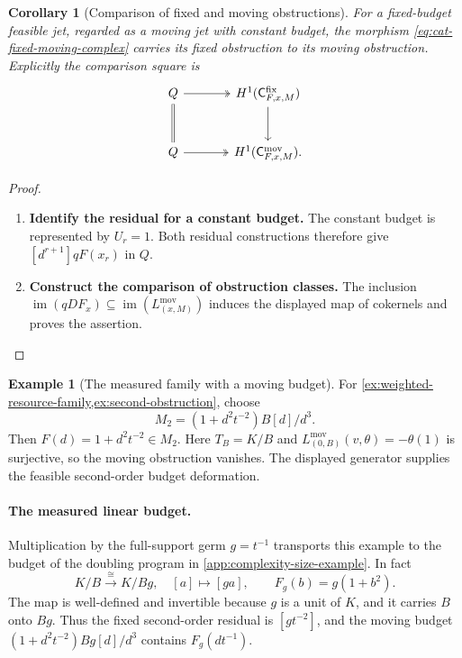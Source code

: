 \documentclass[11pt,a4paper]{article}
\numberwithin{algorithm}{section}
\numberwithin{equation}{section}
\newtheorem{corollary}[corollary]{Corollary}
\theoremstyle{definition}
\newtheorem{example}[example]{Example}
\theoremstyle{remark}
\theoremstyle{plain}
\newcommand{\DCx}{\mathsf{C}}
\theoremstyle{definition}
\theoremstyle{plain}
\begin{document}
\begin{corollary}[Comparison of fixed and moving obstructions]
\label{cor:cat-obstruction-comparison}
For a fixed-budget feasible jet, regarded as a moving jet with
constant budget, the morphism
\eqref{eq:cat-fixed-moving-complex} carries its fixed obstruction
to its moving obstruction.  Explicitly the comparison square is
\[
\begin{tikzcd}[column sep=large,row sep=large]
 Q \arrow[r,two heads] \arrow[d,equal]
   & H^1(\DCx^{\mathrm{fix}}_{F,x,M}) \arrow[d]\\
 Q \arrow[r,two heads]
   & H^1(\DCx^{\mathrm{mov}}_{F,x,M}).
\end{tikzcd}
\]
\end{corollary}
\begin{proof}\leavevmode
\begin{enumerate}[leftmargin=*,align=left]
\item \textbf{Identify the residual for a constant budget.}
The constant budget is represented by $U_r=1$.
Both residual constructions therefore give
$[d^{r+1}]qF(x_r)$ in $Q$.

\item \textbf{Construct the comparison of obstruction classes.}
The inclusion $\operatorname{im}(qDF_x)\subseteq
\operatorname{im}(L^{\mathrm{mov}}_{(x,M)})$ induces the displayed
map of cokernels and proves the assertion.
\end{enumerate}
\end{proof}


\begin{example}[The measured family with a moving budget]
\label{ex:moving-removes-obstruction}
For \cref{ex:weighted-resource-family,ex:second-obstruction}, choose
\[
 M_2=(1+d^2t^{-2})B[d]/d^3.
\]
Then $F(d)=1+d^2t^{-2}\in M_2$. Here $T_B=K/B$ and
$L^{\mathrm{mov}}_{(0,B)}(v,\theta)=-\theta(1)$ is surjective,
so the moving obstruction vanishes. The displayed generator supplies
the feasible second-order budget deformation.
\end{example}

\paragraph{The measured linear budget.}
Multiplication by the full-support germ $g=t^{-1}$ transports
this example to the budget of the doubling program in
\cref{app:complexity-size-example}. In fact
\[
 K/B\xrightarrow{\ \cong\ }K/Bg,\quad [a]\longmapsto[ga],
 \qquad F_g(b)=g(1+b^2).
\]
The map is well-defined and invertible because $g$ is a unit
of $K$, and it carries $B$ onto $Bg$. Thus the fixed
second-order residual is $[gt^{-2}]$, and the moving budget
$(1+d^2t^{-2})Bg[d]/d^3$ contains $F_g(dt^{-1})$.
\end{document}
